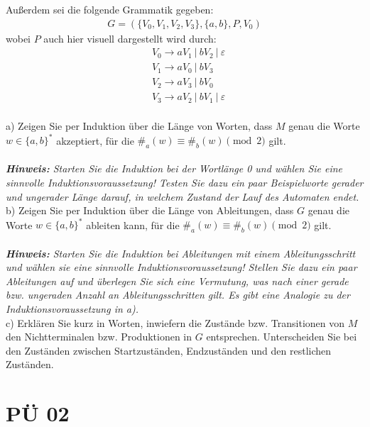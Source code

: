 \documentclass[paper=a4, fontsize=11pt]{scrartcl}
\numberwithin{equation}{section}
\numberwithin{figure}{section}
\numberwithin{table}{section}
\begin{document}
Außerdem sei die folgende Grammatik gegeben: 
\begin{align*}
G = (\{V_0, V_1, V_2, V_3\}, \{a, b\}, P, V_0)
\end{align*}
wobei $P$ auch hier visuell dargestellt wird durch:
\begin{align*}
& V_0 \longrightarrow aV_1~|~bV_2~|~\varepsilon \\
& V_1 \longrightarrow aV_0~|~bV_3 \\
& V_2 \longrightarrow aV_3~|~bV_0 \\
& V_3 \longrightarrow aV_2~|~bV_1~|~\varepsilon 
\end{align*}
\\

a) Zeigen Sie per Induktion über die Länge von Worten, dass $M$ genau die Worte $w \in \{a, b\}^*$ akzeptiert, für die $\#_a(w) \equiv \#_b(w) \pmod 2$ gilt. \\\\
\textit{{\bf Hinweis:} Starten Sie die Induktion bei der Wortlänge 0 und wählen Sie eine sinnvolle Induktionsvoraussetzung! Testen Sie dazu ein paar Beispielworte gerader und ungerader Länge darauf, in welchem Zustand der Lauf des Automaten endet.} \\

b) Zeigen Sie per Induktion über die Länge von Ableitungen, dass $G$ genau die Worte $w \in \{a, b\}^*$ ableiten kann, für die $\#_a(w) \equiv \#_b(w) \pmod 2$ gilt. \\\\
\textit{{\bf Hinweis:} Starten Sie die Induktion bei Ableitungen mit einem Ableitungsschritt und wählen sie eine sinnvolle Induktionsvoraussetzung! Stellen Sie dazu ein paar Ableitungen auf und überlegen Sie sich eine Vermutung, was nach einer gerade bzw. ungeraden Anzahl an Ableitungsschritten gilt. Es gibt eine Analogie zu der Induktionsvoraussetzung in a).} \\

c) Erklären Sie kurz in Worten, inwiefern die Zustände bzw. Transitionen von $M$ den Nichtterminalen bzw. Produktionen in $G$ entsprechen. Unterscheiden Sie bei den Zuständen zwischen Startzuständen, Endzuständen und den restlichen Zuständen. \\


\newpage

\section{PÜ 02}
\end{document}
